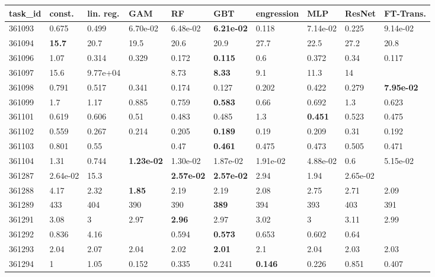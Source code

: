 \begin{table}[ht!]
\centering
\begingroup\footnotesize
\begin{tabular}{llllllllll}
  \hline
\hline
task\_id & const. & lin. reg. & GAM & RF & GBT & engression & MLP & ResNet & FT-Trans. \\ 
  \hline
361093 & 0.675 & 0.499 & 6.70e-02 & 6.48e-02 & \textbf{6.21e-02} & 0.118 & 7.14e-02 & 0.225 & 9.14e-02 \\ 
  361094 & \textbf{15.7} & 20.7 & 19.5 & 20.6 & 20.9 & 27.7 & 22.5 & 27.2 & 20.8 \\ 
  361096 & 1.07 & 0.314 & 0.329 & 0.172 & \textbf{0.115} & 0.6 & 0.372 & 0.34 & 0.117 \\ 
  361097 & 15.6 & 9.77e+04 &  & 8.73 & \textbf{8.33} & 9.1 & 11.3 & 14 &  \\ 
  361098 & 0.791 & 0.517 & 0.341 & 0.174 & 0.127 & 0.202 & 0.422 & 0.279 & \textbf{7.95e-02} \\ 
  361099 & 1.7 & 1.17 & 0.885 & 0.759 & \textbf{0.583} & 0.66 & 0.692 & 1.3 & 0.623 \\ 
  361101 & 0.619 & 0.606 & 0.51 & 0.483 & 0.485 & 1.3 & \textbf{0.451} & 0.523 & 0.475 \\ 
  361102 & 0.559 & 0.267 & 0.214 & 0.205 & \textbf{0.189} & 0.19 & 0.209 & 0.31 & 0.192 \\ 
  361103 & 0.801 & 0.55 &  & 0.47 & \textbf{0.461} & 0.475 & 0.473 & 0.505 & 0.471 \\ 
  361104 & 1.31 & 0.744 & \textbf{1.23e-02} & 1.30e-02 & 1.87e-02 & 1.91e-02 & 4.88e-02 & 0.6 & 5.15e-02 \\ 
  361287 & 2.64e-02 & 15.3 &  & \textbf{2.57e-02} & \textbf{2.57e-02} & 2.94 & 1.94 & 2.65e-02 &  \\ 
  361288 & 4.17 & 2.32 & \textbf{1.85} & 2.19 & 2.19 & 2.08 & 2.75 & 2.71 & 2.09 \\ 
  361289 & 433 & 404 & 390 & 390 & \textbf{389} & 394 & 393 & 403 & 391 \\ 
  361291 & 3.08 & 3 & 2.97 & \textbf{2.96} & 2.97 & 3.02 & 3 & 3.11 & 2.99 \\ 
  361292 & 0.836 & 4.16 &  & 0.594 & \textbf{0.573} & 0.653 & 0.602 & 0.64 &  \\ 
  361293 & 2.04 & 2.07 & 2.04 & 2.02 & \textbf{2.01} & 2.1 & 2.04 & 2.03 & 2.03 \\ 
  361294 & 1 & 1.05 & 0.152 & 0.335 & 0.241 & \textbf{0.146} & 0.226 & 0.851 & 0.407 \\ 

\end{tabular}
\end{table}
